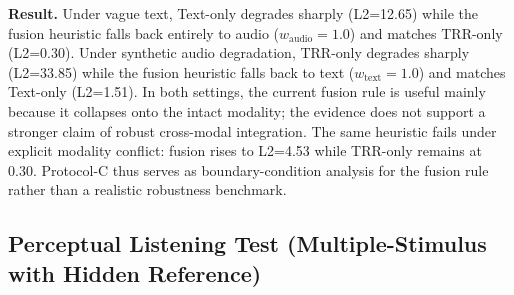 \begin{table}[t]
\centering
\caption{Selected Protocol-C boundary cases ($N=211$). The current fusion heuristic mainly acts as a fallback rule: it collapses onto the intact modality under single-modality degradation, but degrades substantially under explicit modality conflict.}
\label{tab:robustness}
\small
\setlength{\tabcolsep}{3pt}
\end{table}

\textbf{Result.} Under vague text, Text-only degrades sharply (L2=12.65) while the fusion heuristic falls back entirely to audio ($w_{\text{audio}}=1.0$) and matches TRR-only (L2=0.30). Under synthetic audio degradation, TRR-only degrades sharply (L2=33.85) while the fusion heuristic falls back to text ($w_{\text{text}}=1.0$) and matches Text-only (L2=1.51). In both settings, the current fusion rule is useful mainly because it collapses onto the intact modality; the evidence does not support a stronger claim of robust cross-modal integration. The same heuristic fails under explicit modality conflict: fusion rises to L2=4.53 while TRR-only remains at 0.30. Protocol-C thus serves as boundary-condition analysis for the fusion rule rather than a realistic robustness benchmark.

\subsection{Perceptual Listening Test (Multiple-Stimulus with Hidden Reference)}
\label{ssec:mushra}

